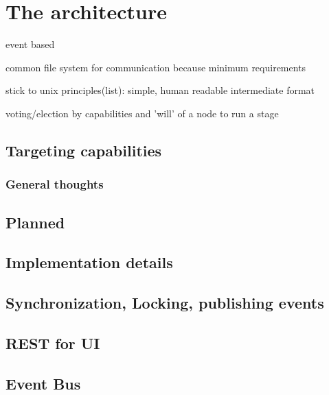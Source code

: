 \chapter{The architecture}

event based

common file system for communication because minimum requirements

stick to unix principles(list): simple, human readable intermediate format

voting/election by capabilities and 'will' of a node to run a stage

\section{Targeting capabilities}

\subsection{General thoughts}

\section{Planned}

\section{Implementation details}

\section{Synchronization, Locking, publishing events}

\section{REST for UI}

\section{Event Bus}